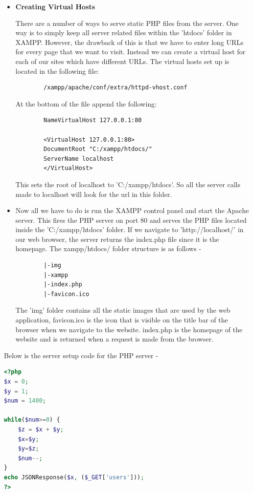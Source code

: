 \documentclass[../thesis.tex]{subfiles}
\begin{document}
	\begin{itemize}
		\item \textbf{Creating Virtual Hosts}
		\newline

		There are a number of ways to serve static PHP files from the server. One way is to simply keep all server related files within the 'htdocs' folder in XAMPP. However, the drawback of this is that we have to enter long URLs for every page that we want to visit. Instead we can create a virtual host for each of our sites which have different URLs. The virtual hosts set up is located in the following file: 
		\begin{verbatim}
		/xampp/apache/conf/extra/httpd-vhost.conf
		\end{verbatim}
		At the bottom of the file append the following:
		\begin{verbatim}
		NameVirtualHost 127.0.0.1:80
		
		<VirtualHost 127.0.0.1:80>
		DocumentRoot "C:/xampp/htdocs/"
		ServerName localhost
		</VirtualHost>
		\end{verbatim}
		This sets the root of localhost to 'C:/xampp/htdocs'. So all the server calls made to localhost will look for the url in this folder. 
		\smallskip
		\item Now all we have to do is run the XAMPP control panel and start the Apache server. This fires the PHP server on port 80 and serves the PHP files located inside the 'C:/xampp/htdocs' folder. If we navigate to 'http://localhost/' in our web browser, the server returns the index.php file since it is the homepage. The xampp/htdocs/ folder structure is as follows - 
		\begin{verbatim}
		|-img
		|-xampp
		|-index.php
		|-favicon.ico
		\end{verbatim}
		The 'img' folder contains all the static images that are used by the web application, favicon.ico is the icon that is visible on the title bar of the browser when we navigate to the website. index.php is the homepage of the website and is returned when a request is made from the browser.
	\end{itemize}
	Below is the server setup code for the PHP server - 
	\begin{lstlisting}[language=PHP, caption=Fibonacci module code for PHP server]
<?php
$x = 0;    
$y = 1;
$num = 1400; 

while($num>=0) {    
	$z = $x + $y;         
	$x=$y;       
	$y=$z;
	$num--;
} 
echo JSONResponse($x, ($_GET['users']));
?>
	\end{lstlisting}
\end{document}

